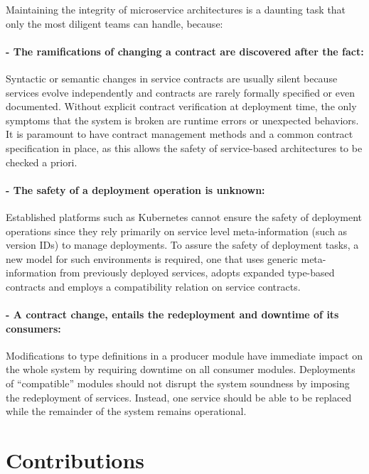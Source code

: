Maintaining the integrity of microservice architectures is a daunting task that only the most diligent teams can handle, because:

\paragraph{- The ramifications of changing a contract are discovered after the fact:}

Syntactic or semantic changes in service contracts are usually silent because services evolve independently and contracts are rarely formally specified or even documented.
Without explicit contract verification at deployment time, the only symptoms that the system is broken are runtime errors or unexpected behaviors.
It is paramount to have contract management methods and a common contract specification in place, as this allows the safety of service-based architectures to be checked a priori.

\paragraph{- The safety of a deployment operation is unknown:}

Established platforms such as Kubernetes cannot ensure the safety of deployment operations since they rely primarily on service level meta-information (such as version IDs) to manage deployments.
To assure the safety of deployment tasks, a new model for such environments is required,
one that uses generic meta-information from previously deployed services, adopts expanded type-based contracts and employs a compatibility relation on service contracts.

\paragraph{- A contract change, entails the redeployment and downtime of its consumers:}

Modifications to type definitions in a producer module have immediate
impact on the whole system by requiring downtime on all consumer modules.
Deployments of “compatible” modules should not disrupt the system soundness by imposing the redeployment of services.
Instead, one service should be able to be replaced while the remainder of the system remains operational.

\section{Contributions} %
\label{sec:contributions}

